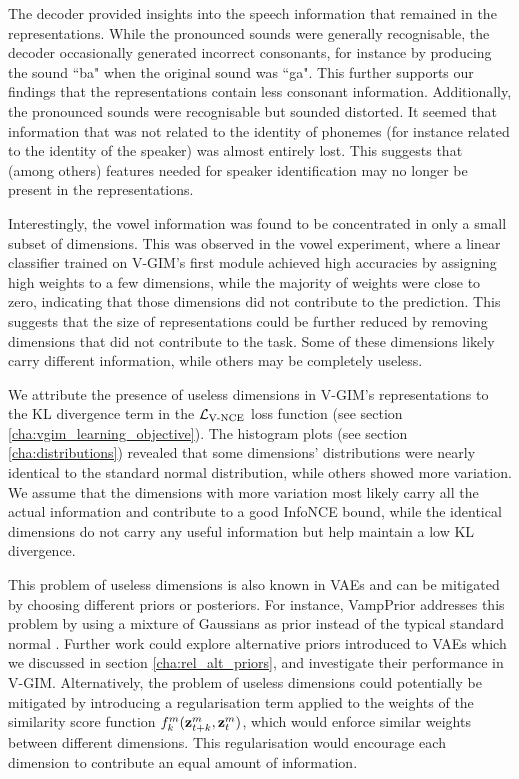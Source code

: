 	The decoder provided insights into the speech information that remained in the representations. While the pronounced sounds were generally recognisable, the decoder occasionally generated incorrect consonants, for instance by producing the sound ``ba" when the original sound was ``ga". This further supports our findings that the representations contain less consonant information. Additionally, the pronounced sounds were recognisable but sounded distorted. It seemed that information that was not related to the identity of phonemes (for instance related to the identity of the speaker) was almost entirely lost. This suggests that (among others) features needed for speaker identification may no longer be present in the representations. 
	
	Interestingly, the vowel information was found to be concentrated in only a small subset of dimensions. This was observed in the vowel experiment, where a linear classifier trained on V-GIM's first module achieved high accuracies by assigning high weights to a few dimensions, while the majority of weights were close to zero, indicating that those dimensions did not contribute to the prediction. This suggests that the size of representations could be further reduced by removing dimensions that did not contribute to the task. Some of these dimensions likely carry different information, while others may be completely useless.
		
	We attribute the presence of useless dimensions in V-GIM's representations to the KL divergence term in the $\mathcal{L}_{\text{V-NCE}}$ loss function (see section \ref{cha:vgim_learning_objective}). The histogram plots (see section \ref{cha:distributions}) revealed that some dimensions' distributions were nearly identical to the standard normal distribution, while others showed more variation. We assume that the dimensions with more variation most likely carry all the actual information and contribute to a good InfoNCE bound, while the identical dimensions do not carry any useful information but help maintain a low KL divergence.
	
			
	This problem of useless dimensions is also known in VAEs and can be mitigated by choosing different priors or posteriors. For instance, VampPrior addresses this problem by using a mixture of Gaussians as prior instead of the typical standard normal \citep{tomczakVAEVampPrior2018}. Further work could explore alternative priors introduced to VAEs which we discussed in section \ref{cha:rel_alt_priors}, and investigate their performance in V-GIM. Alternatively, the problem of useless dimensions could potentially be mitigated by introducing a regularisation term applied to the weights of the similarity score function $f_k^m({\mathbf{z}_{t+k}^m},{\mathbf{z}_t^m})$, which would enforce similar weights between different dimensions. This regularisation would encourage each dimension to contribute an equal amount of information.
	
